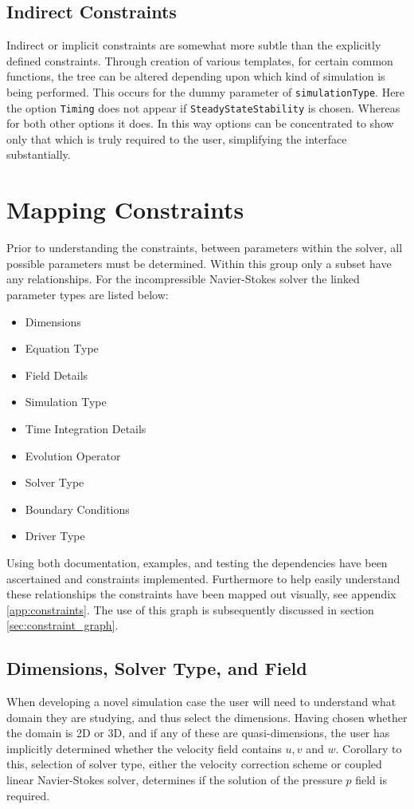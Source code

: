 \documentclass[11pt, a4paper]{report}
\begin{document}
\subsection{Indirect Constraints}
Indirect or implicit constraints are somewhat more subtle than the explicitly defined constraints. Through creation of various templates, for certain common functions, the tree can be altered depending upon which kind of simulation is being performed. This occurs for the dummy parameter of \texttt{simulationType}. Here the option \texttt{Timing} does not appear if \texttt{SteadyStateStability} is chosen. Whereas for both other options it does. In this way options can be concentrated to show only that which is truly required to the user, simplifying the interface substantially.

\section{Mapping Constraints}
Prior to understanding the constraints, between parameters within the solver, all possible parameters must be determined. Within this group only a subset have any relationships. For the incompressible Navier-Stokes solver the linked parameter types are listed below:
\begin{multicols}{3}
\begin{itemize}
\item Dimensions 
\item Equation Type
\item Field Details
\item Simulation Type
\item Time Integration Details
\item Evolution Operator
\item Solver Type
\item Boundary Conditions
\item Driver Type
\end{itemize}
\end{multicols}
Using both documentation, examples, and testing the dependencies have been ascertained and constraints implemented. Furthermore to help easily understand these relationships the constraints have been mapped out visually, see appendix \ref{app:constraints}. The use of this graph is subsequently discussed in section \ref{sec:constraint_graph}.

\subsection{Dimensions, Solver Type, and Field}
When developing a novel simulation case the user will need to understand what domain they are studying, and thus select the dimensions. Having chosen whether the domain is 2D or 3D, and if any of these are quasi-dimensions, the user has implicitly determined whether the velocity field contains $u, v$ and $w$. Corollary to this, selection of solver type, either the velocity correction scheme or coupled linear Navier-Stokes solver, determines if the solution of the pressure $p$ field is required.
\end{document}
